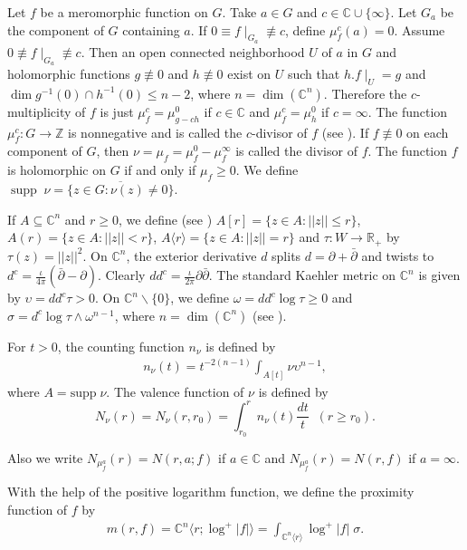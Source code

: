 \documentclass[11pt, reqno]{amsart}
\newtheorem*{cor A}{Corollary A}
\newtheorem*{cor B}{Corollary B}
\newcommand{\ol}{\overline}
\numberwithin{equation}{section}
\begin{document}
\medskip
Let $f$ be a meromorphic function on $G$.
Take $a\in G$ and $c\in\mathbb{C}\cup\{\infty\}$. Let $G_a$ be the component of $G$ containing $a$. If $0\equiv f\mid_{G_a}\not\equiv c$, define $\mu^c_f(a)=0$. Assume $0\not\equiv f\mid_{G_a}\not\equiv c$. Then an open connected neighborhood $U$ of $a$ in $G$ and holomorphic functions $g\not\equiv 0$ and $h\not\equiv 0$ exist on $U$ such that $h. f\mid_U=g$ and $\dim g^{-1}(0)\cap h^{-1}(0)\leq n-2$, where $n=\dim(\mathbb{C}^n)$. Therefore the $c$-multiplicity of $f$ is just $\mu^c_f=\mu^0_{g-ch}$ if $c\in\mathbb{C}$ and $\mu^c_f=\mu^0_h$ if $c=\infty$. The function $\mu^c_f:G\to \mathbb{Z}$ is nonnegative and is called the $c$-divisor of $f$ (see \cite[pp. 12]{Stoll-1974}).
If $f\not\equiv 0$ on each component of $G$, then $\nu=\mu_f=\mu^0_f-\mu^{\infty}_f$ is called the divisor of $f$. The function $f$ is holomorphic on $G$ if and only if $\mu_f\geq 0$. We define $\displaystyle \operatorname{supp}\; \nu=\ol{\{z\in G: \nu(z)\neq 0\}}$.

\medskip
If $A\subseteq \mathbb{C}^n$ and $r\geq 0$, we define (see \cite[pp. 6]{Stoll-1974})
$A[r]=\{z\in A: ||z||\leq r\}$, $A(r)=\{z\in A: ||z||<r\}$, $A\langle r\rangle=\{z\in A: ||z||=r\}$ and $\tau:W\to \mathbb{R}_+$ by $\tau(z)=||z||^2$.
On $\mathbb{C}^n$, the exterior derivative $d$ splits $d= \partial+ \bar{\partial}$ and twists to $d^c= \frac{\iota}{4\pi}\left(\bar{\partial}- \partial\right)$. Clearly $dd^{c}= \frac{\iota}{2\pi}\partial\bar{\partial}$. The standard Kaehler metric on $\mathbb{C}^n$ is given by $\upsilon=dd^c\tau>0$. On $\mathbb{C}^n\backslash  \{0\}$, we define
$\displaystyle \omega=dd^c\log \tau\geq 0$ and $\sigma=d^c\log \tau \wedge \omega^{n-1}$, where $n=\dim(\mathbb{C}^n)$ (see \cite[pp. 6]{Stoll-1974}). 

For $t>0$, the counting function $n_{\nu}$ is defined by
\begin{align*}
 n_{\nu}(t)=t^{-2(n-1)}\int_{A[t]}\nu \upsilon^{n-1},
 \end{align*}
where $A=\text{supp}\;\nu$. The valence function of $\nu$ is defined by
\[N_{\nu}(r)=N_{\nu}(r,r_0)=\int_{r_0}^r n_{\nu}(t)\frac{dt}{t}\;\;(r\geq r_0).\]

\medskip
Also we write $N_{\mu_f^a}(r)=N(r,a;f)$ if $a\in\mathbb{C}$ and $N_{\mu_f^a}(r)=N(r,f)$ if $a=\infty$.


\smallskip
With the help of the positive logarithm function, we define the proximity function of $f$ by
\begin{align*}
m(r, f)=\mathbb{C}^n\langle r; \log^+ |f| \rangle=\int_{\mathbb{C}^n\langle r\rangle} \log^+ |f|\;\sigma.
\end{align*}
\end{document}
